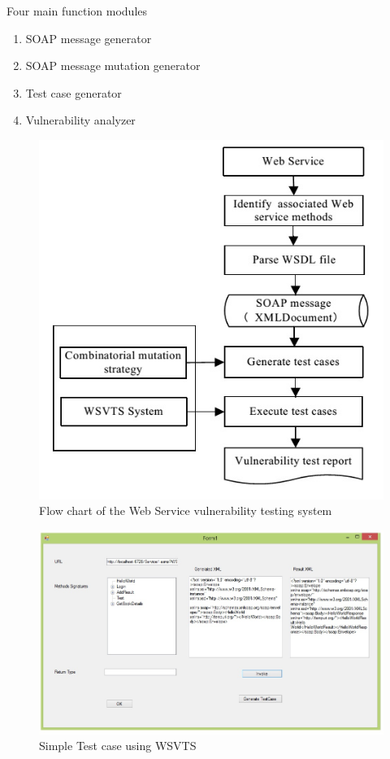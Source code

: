 \documentclass{bredelebeamer}
\begin{document}
\begin{frame}
	Four main function modules
	\newline
	\begin{enumerate}
		\large
		\item SOAP message generator
		\newline
		\item SOAP message mutation generator
		\newline
		\item Test case generator
		\newline
		\item Vulnerability analyzer
		\newline
	\end{enumerate}
\end{frame}


\begin{frame}
	
	\begin{figure}
\centering
\includegraphics[width=0.5\linewidth]{images/WS/Fig4}
\caption{Flow chart of the Web Service vulnerability testing system}
\label{fig:Fig4}
\end{figure}

	
\end{frame}

\begin{frame}
	
	\begin{figure}
\centering
\includegraphics[width=0.7\linewidth]{images/WS/Fig7}
\caption{Simple Test case using WSVTS}
\label{fig:Fig7}
\end{figure}

	
\end{frame}
\end{document}
